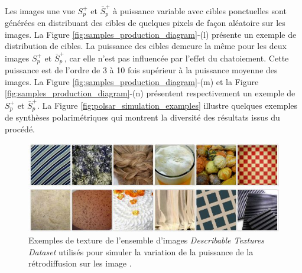 Les images une vue $S_p^+$ et   $\bar{S}_p^+$ à puissance variable avec cibles ponctuelles sont générées en distribuant des cibles de quelques pixels de façon aléatoire sur les images. La Figure \ref{fig:samples_production_diagram}-(l) présente un exemple de distribution de cibles. La puissance des cibles demeure la même pour les deux images $S_p^+$ et $\bar{S}_p^+$,  car elle n'est pas influencée par l'effet du chatoiement.  Cette puissance est de l'ordre de 3 à 10 fois supérieur à la puissance moyenne des images. La Figure \ref{fig:samples_production_diagram}-(m) et la Figure \ref{fig:samples_production_diagram}-(n) présentent respectivement un exemple de $S_p^+$ et $\bar{S}_p^+$.  La Figure \ref{fig:polsar_simulation_examples} illustre quelques exemples de synthèses polarimétriques qui montrent la diversité des résultats issus du procédé.


\begin{figure}
  \includegraphics[width=0.85\linewidth]{figures/Chap3/texture-dataset-diagram.jpg}
  \centering
  \caption{
  \small{Exemples de texture de l'ensemble d'images \textit{Describable Textures Dataset} \cite{cimpoi14describing} utilisés pour simuler la variation de la puissance de la rétrodiffusion sur les image \acrpolsar.}
  }
  \label{fig:dtd-example-diagram}
\end{figure}

